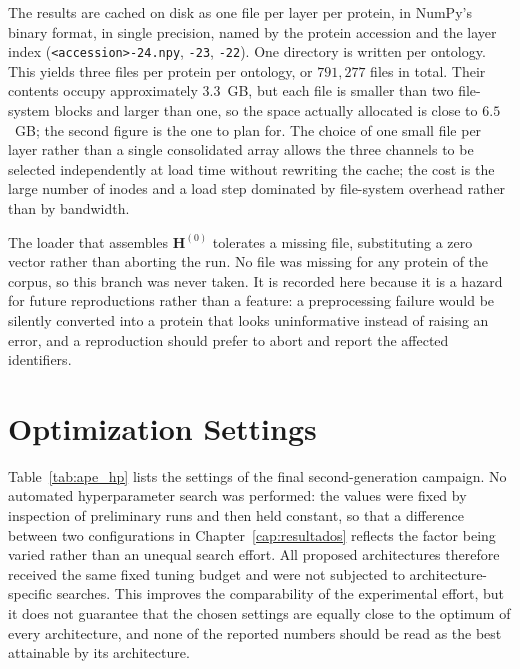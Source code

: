 \documentclass[Ingles]{ic-tese-v3}
\begin{document}
\begin{appendices}{}
The results are cached on disk as one file per layer per protein, in NumPy's binary format, in single
precision, named by the protein accession and the layer index (\texttt{<accession>-24.npy},
\texttt{-23}, \texttt{-22}). One directory is written per ontology. This yields three files per
protein per ontology, or $791{,}277$ files in total. Their contents occupy approximately $3.3$~GB,
but each file is smaller than two file-system blocks and larger than one, so the space actually
allocated is close to $6.5$~GB; the second figure is the one to plan for. The choice of one small
file per layer rather than a single consolidated array allows the three channels to be selected
independently at load time without rewriting the cache; the cost is the large number of inodes and
a load step dominated by file-system overhead rather than by bandwidth.

The loader that assembles $\mathbf{H}^{(0)}$ tolerates a missing file, substituting a zero vector
rather than aborting the run. No file was missing for any protein of the corpus, so this branch was
never taken. It is recorded here because it is a hazard for future reproductions rather than a
feature: a preprocessing failure would be silently converted into a protein that looks uninformative
instead of raising an error, and a reproduction should prefer to abort and report the affected
identifiers.

\section{Optimization Settings}
\label{ape:hiperparametros}

Table~\ref{tab:ape_hp} lists the settings of the final second-generation campaign. No automated
hyperparameter search was performed: the values were fixed by inspection of preliminary runs and
then held constant, so that a difference between two configurations in
Chapter~\ref{cap:resultados} reflects the factor being varied rather than an unequal search effort.
All proposed architectures therefore received the same fixed tuning budget and were not subjected to
architecture-specific searches. This improves the comparability of the experimental effort, but it
does not guarantee that the chosen settings are equally close to the optimum of every architecture,
and none of the reported numbers should be read as the best attainable by its architecture.


\end{appendices}
\end{document}
